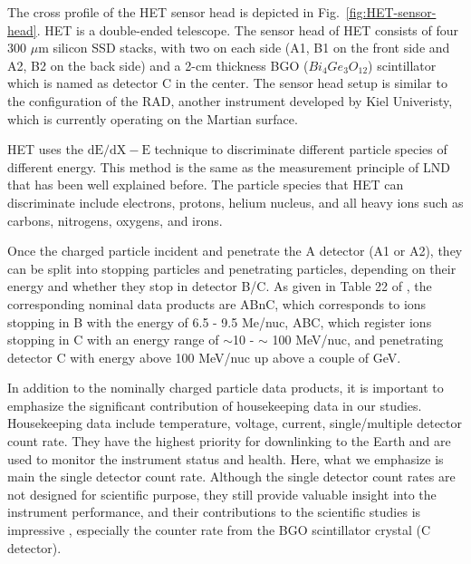 The cross profile of the \ac{HET} sensor head is depicted in Fig.~\ref{fig:HET-sensor-head}. \ac{HET} is a double-ended telescope. The sensor head of \ac{HET} consists of four 300 $\mu$m silicon \ac{SSD} stacks, with two on each side (A1, B1 on the front side and A2, B2 on the back side) and a 2-cm thickness \ac{BGO} ($Bi_{4}Ge_{3}O_{12}$) scintillator which is named as detector C in the center. The sensor head setup is similar to the configuration of the \ac{RAD}, another instrument developed by Kiel Univeristy, which is currently operating on the Martian surface.  

\ac{HET} uses the $\mathrm{dE/dX - E}$ technique to discriminate different particle species of different energy. This method is the same as the measurement principle of \ac{LND} that has been well explained before. The particle species that \ac{HET} can discriminate include electrons, protons, helium nucleus, and all heavy ions such as carbons, nitrogens, oxygens, and irons.  

Once the charged particle incident and penetrate the A detector (A1 or A2), they can be split into stopping particles and penetrating particles, depending on their energy and whether they stop in detector B/C. As given in Table 22 of \citet{RodriguezPacheco-2019-EPD}, the corresponding nominal data products are ABnC, which corresponds to ions stopping in B with the energy of 6.5 - 9.5 Me/nuc, ABC, which register ions stopping in C with an energy range of $\sim$10 - $\sim$ 100 MeV/nuc, and penetrating detector C with energy above 100 MeV/nuc up above a couple of GeV.



In addition to the nominally charged particle data products, it is important to emphasize the significant contribution of housekeeping data in our studies. Housekeeping data include temperature, voltage, current, single/multiple detector count rate.  
They have the highest priority for downlinking to the Earth and are used to monitor the instrument status and health. Here, what we emphasize is main the single detector count rate. Although the single detector count rates are not designed for scientific purpose, they still provide valuable insight into the instrument performance, and their contributions to the scientific studies is impressive \citep{Wimmer2021AA}, especially the counter rate from the \ac{BGO} scintillator crystal (C detector). 

